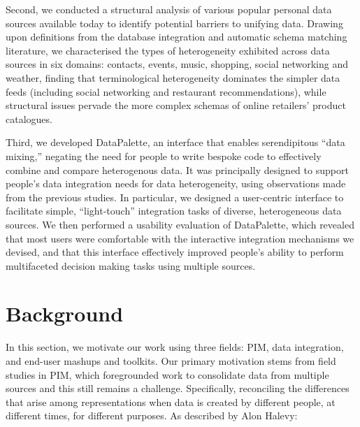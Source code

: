 \documentclass{sigchi}
\begin{document}

Second, we conducted a structural analysis of various popular personal data sources available today to identify potential barriers to unifying data.  Drawing upon definitions from the database integration and automatic schema matching literature, we characterised the types of heterogeneity exhibited across data sources in six domains: contacts, events, music, shopping, social networking and weather, finding that terminological heterogeneity dominates the simpler data feeds (including social networking and restaurant recommendations), while structural issues pervade the more complex schemas of online retailers' product catalogues.


Third, we developed DataPalette, an interface that enables serendipitous ``data mixing,'' negating the need for people to write bespoke code to effectively combine and compare heterogenous data.  It was principally designed to support people's data integration needs for data heterogeneity, using observations made from the previous studies.  In particular, we designed a user-centric interface to facilitate simple, ``light-touch'' integration tasks of diverse, heterogeneous data sources.  We then performed a usability evaluation of DataPalette, which revealed that most users were comfortable with the interactive integration mechanisms we devised, and that this interface effectively improved people's ability to perform multifaceted decision making tasks using multiple sources.

\section{Background}

In this section, we motivate our work using three fields: PIM, data integration, and end-user mashups and toolkits.  Our primary motivation stems from field studies in PIM, which foregrounded work to consolidate data from multiple sources and this still remains a challenge.  Specifically, reconciling the differences that arise among representations when data is created by different people, at different times, for different purposes. As described by Alon Halevy:
\end{document}
